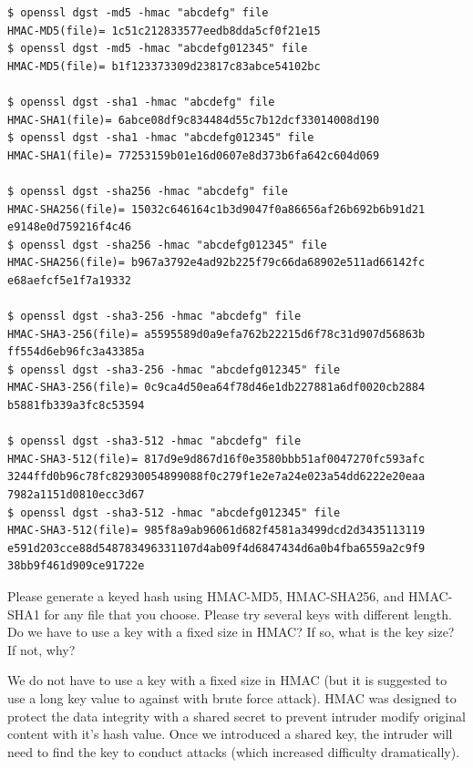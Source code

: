 \documentclass[11pt]{article}
\begin{document}
\begin{verbatim}
$ openssl dgst -md5 -hmac "abcdefg" file
HMAC-MD5(file)= 1c51c212833577eedb8dda5cf0f21e15
$ openssl dgst -md5 -hmac "abcdefg012345" file
HMAC-MD5(file)= b1f123373309d23817c83abce54102bc

$ openssl dgst -sha1 -hmac "abcdefg" file
HMAC-SHA1(file)= 6abce08df9c834484d55c7b12dcf33014008d190
$ openssl dgst -sha1 -hmac "abcdefg012345" file
HMAC-SHA1(file)= 77253159b01e16d0607e8d373b6fa642c604d069

$ openssl dgst -sha256 -hmac "abcdefg" file
HMAC-SHA256(file)= 15032c646164c1b3d9047f0a86656af26b692b6b91d21
e9148e0d759216f4c46
$ openssl dgst -sha256 -hmac "abcdefg012345" file
HMAC-SHA256(file)= b967a3792e4ad92b225f79c66da68902e511ad66142fc
e68aefcf5e1f7a19332

$ openssl dgst -sha3-256 -hmac "abcdefg" file
HMAC-SHA3-256(file)= a5595589d0a9efa762b22215d6f78c31d907d56863b
ff554d6eb96fc3a43385a
$ openssl dgst -sha3-256 -hmac "abcdefg012345" file
HMAC-SHA3-256(file)= 0c9ca4d50ea64f78d46e1db227881a6df0020cb2884
b5881fb339a3fc8c53594

$ openssl dgst -sha3-512 -hmac "abcdefg" file
HMAC-SHA3-512(file)= 817d9e9d867d16f0e3580bbb51af0047270fc593afc
3244ffd0b96c78fc82930054899088f0c279f1e2e7a24e023a54dd6222e20eaa
7982a1151d0810ecc3d67
$ openssl dgst -sha3-512 -hmac "abcdefg012345" file
HMAC-SHA3-512(file)= 985f8a9ab96061d682f4581a3499dcd2d3435113119
e591d203cce88d548783496331107d4ab09f4d6847434d6a0b4fba6559a2c9f9
38bb9f461d909ce91722e
\end{verbatim}

Please generate a keyed hash using HMAC-MD5, HMAC-SHA256, and HMAC-SHA1 for any file that
you choose. Please try several keys with different length. Do we have to use a key with a fixed size in
HMAC? If so, what is the key size? If not, why?

We do not have to use a key with a fixed size in HMAC (but it is suggested to use a long key value to against with brute force attack). HMAC was designed to protect the data integrity with a shared secret to prevent intruder modify original content with it's hash value. Once we introduced a shared key, the intruder will need to find the key to conduct attacks (which increased difficulty dramatically).

\medskip
\end{document}
